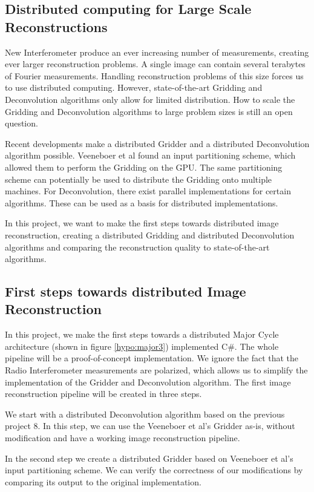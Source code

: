 \subsection{Distributed computing for Large Scale Reconstructions}
New Interferometer produce an ever increasing number of measurements, creating ever larger reconstruction problems. A single image can contain several terabytes of Fourier measurements. Handling reconstruction problems of this size forces us to use distributed computing. However, state-of-the-art Gridding and Deconvolution algorithms only allow for limited distribution. How to scale the Gridding and Deconvolution algorithms to large problem sizes is still an open question.

Recent developments make a distributed Gridder and a distributed Deconvolution algorithm possible. Veeneboer et al\cite{veenboer2017image} found an input partitioning scheme, which allowed them to perform the Gridding on the GPU. The same partitioning scheme can potentially be used to distribute the Gridding onto multiple machines. For Deconvolution, there exist parallel implementations for certain algorithms\cite{dabbech2015moresane}. These can be used as a basis for distributed implementations.

In this project, we want to make the first steps towards distributed image reconstruction, creating a distributed Gridding and distributed Deconvolution algorithms and comparing the reconstruction quality to state-of-the-art algorithms.

\subsection{First steps towards distributed Image Reconstruction}
In this project, we make the first steps towards a distributed Major Cycle architecture (shown in figure \ref{hypo:major3}) implemented C\#. The whole pipeline will be a proof-of-concept implementation. We ignore the fact that the Radio Interferometer measurements are polarized, which allows us to simplify the implementation of the Gridder and Deconvolution algorithm. The first image reconstruction pipeline will be created in three steps.

We start with a distributed Deconvolution algorithm based on the previous project 8. In this step, we can use the Veeneboer et al's Gridder as-is, without modification and have a working image reconstruction pipeline.

In the second step we create a distributed Gridder based on Veeneboer et al's input partitioning scheme. We can verify the correctness of our modifications by comparing its output to the original implementation. 

